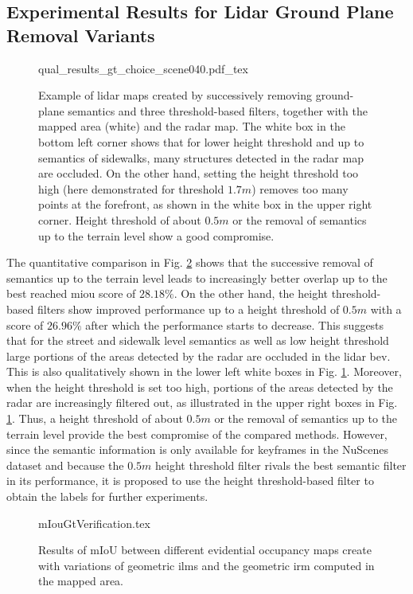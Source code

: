 \subsection{Experimental Results for Lidar Ground Plane Removal Variants}
\label{subsec:exp_results_gt}
\begin{figure}[H]
	\begin{center}
		{qual_results_gt_choice_scene040.pdf_tex}
		\caption{\label{fig:qual_results_gt_choice_scene040}Example of lidar maps created by successively removing ground-plane semantics and three threshold-based filters, together with the mapped area (white) and the radar map. The white box in the bottom left corner shows that for lower height threshold and up to semantics of sidewalks, many structures detected in the radar map are occluded. On the other hand, setting the height threshold too high (here demonstrated for threshold $1.7m$) removes too many points at the forefront, as shown in the white box in the upper right corner. Height threshold of about $0.5m$ or the removal of semantics up to the terrain level show a good compromise.}
	\end{center}
\end{figure} 
The quantitative comparison in Fig. \ref{fig:miou_results_gt_choice} shows that the successive removal of semantics up to the terrain level leads to increasingly better overlap up to the best reached m\gls{iou} score of $28.18\%$. On the other hand, the height threshold-based filters show improved performance up to a height threshold of $0.5m$ with a score of $26.96\%$ after which the performance starts to decrease. This suggests that for the street and sidewalk level semantics as well as low height threshold large portions of the areas detected by the radar are occluded in the lidar \gls{bev}. This is also qualitatively shown in the lower left white boxes in Fig. \ref{fig:qual_results_gt_choice_scene040}. Moreover, when the height threshold is set too high, portions of the areas detected by the radar are increasingly filtered out, as illustrated in the upper right boxes in Fig. \ref{fig:qual_results_gt_choice_scene040}. Thus, a height threshold of about $0.5m$ or the removal of semantics up to the terrain level provide the best compromise of the compared methods. However, since the semantic information is only available for keyframes in the NuScenes dataset and because the $0.5m$ height threshold filter rivals the best semantic filter in its performance, it is proposed to use the height threshold-based filter to obtain the labels for further experiments.
\begin{figure}[htp!]
	\begin{center}
		{mIouGtVerification.tex}
		\caption{\label{fig:miou_results_gt_choice}Results of mIoU between different evidential occupancy maps create with variations of geometric \gls{ilm}s and the geometric \gls{irm} computed in the mapped area.}
	\end{center}
\end{figure}
%
